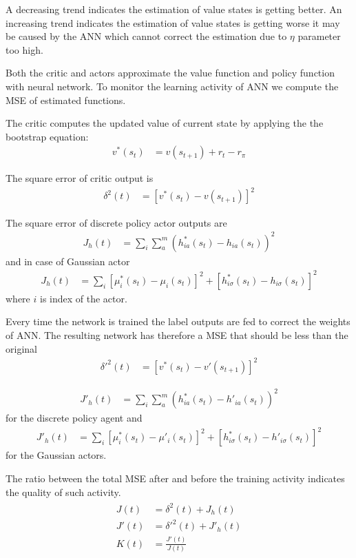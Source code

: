 \documentclass[]{article}
\begin{document}
A decreasing trend indicates the estimation of value states is getting better.
An increasing trend indicates the estimation of value states is getting worse it may be caused by the ANN which cannot correct the estimation due to $ \eta $ parameter too high.

Both the critic and actors approximate the value function and policy function with neural network.
To monitor the learning activity of ANN we compute the MSE of estimated functions.

The critic computes the updated value of current state by applying the the bootstrap equation:
\begin{align*}
	v^*(s_t)&	= v(s_{t+1}) + r_t - r_\pi 
\end{align*}

The square error of critic output is
\begin{align*}
	\delta^2(t)&	= [v^*(s_t) - v(s_{t+1})]^2
\end{align*}

The square error of discrete policy actor outputs are
\begin{align*}
	J_h(t)&	= \sum_i \sum_a^m (h_{ia}^*(s_t) - h_{ia}(s_t))^2
\end{align*}
and in case of Gaussian actor
\begin{align*}
	J_h(t)&	= \sum_i [\mu_i^*(s_t) - \mu_i(s_t)]^2 + [h_{i\sigma}^*(s_t) - h_{i\sigma}(s_t)]^2
\end{align*}
where $ i $ is index of the actor.

Every time the network is trained the label outputs are fed to correct the weights of ANN.
The resulting network has therefore a MSE that should be less than the original
\begin{align*}
	\delta'^2(t)&	= [v^*(s_t) - v'(s_{t+1})]^2
\end{align*}

\begin{align*}
	J'_h(t)&		= \sum_i \sum_a^m (h_{ia}^*(s_t) - h'_{ia}(s_t))^2
\end{align*}
for the discrete policy agent and
\begin{align*}
	J'_h(t)&	= \sum_i [\mu_i^*(s_t) - \mu'_i(s_t)]^2 + [h_{i\sigma}^*(s_t) - h'_{i\sigma}(s_t)]^2
\end{align*}
for the Gaussian actors.

The ratio between the total MSE after and before the training activity indicates the quality of such activity.
\begin{align}
\begin{split}
	J(t)&	= \delta^2(t) + J_h(t)
	\\
	J'(t)&	= \delta'^2(t) + J'_h(t)
	\\
	K(t)&	= \frac{J'(t)}{J(t)}
\end{split}
\end{align}
\end{document}
